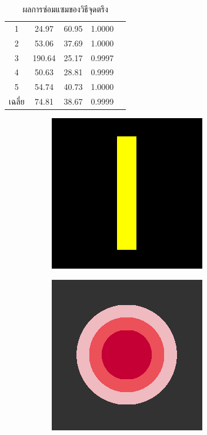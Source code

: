 \documentclass[hidelinks, a4paper,12pt]{article}
\numberwithin{equation}{section}							%
\numberwithin{equation}{section}
\begin{document}
{\begin{table}[H]
\begin{tabular}[ht]{|c|c|c|c|c|}
		\hline
		1 & 24.97 & 60.95 & 1.0000 \\ 
		2 & 53.06 & 37.69 & 1.0000 \\
		3 &  190.64 & 25.17 & 0.9997 \\
		4 & 50.63  & 28.81  & 0.9999 \\
		5 & 54.74  & 40.73  & 1.0000 \\
		\hline
		เฉลี่ย & 74.81  & 38.67  & 0.9999 \\
		\hline
	\end{tabular}
	\caption{ผลการซ่อมแซมของวิธีจุดตรึง}
\end{table}	
\begin{figure}[H]
	\centering
	\begin{subfigure}{0.4\linewidth}
		\centering
		\includegraphics[width=0.8\linewidth]{images/result_ex1/splitbergman01.png}
	\end{subfigure}
	\begin{subfigure}{0.4\linewidth}
		\centering
		\includegraphics[width=0.8\linewidth]{images/result_ex1/splitbergman02.png}

\end{subfigure}
\end{figure}}
\end{document}
